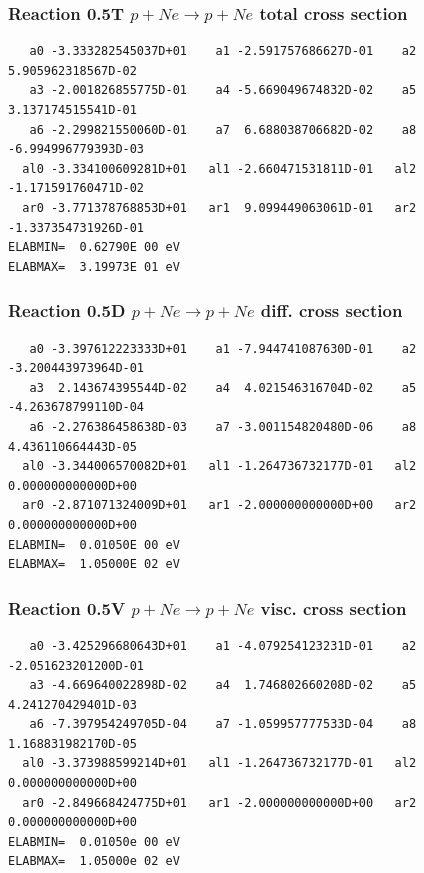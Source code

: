 \documentclass[12pt,dvips]{article}
\begin{document}
\subsubsection{
Reaction 0.5T   $ p + Ne \rightarrow p + Ne $ total cross
section }



\begin{small}\begin{verbatim}
   a0 -3.333282545037D+01    a1 -2.591757686627D-01    a2  5.905962318567D-02
   a3 -2.001826855775D-01    a4 -5.669049674832D-02    a5  3.137174515541D-01
   a6 -2.299821550060D-01    a7  6.688038706682D-02    a8 -6.994996779393D-03
  al0 -3.334100609281D+01   al1 -2.660471531811D-01   al2 -1.171591760471D-02
  ar0 -3.771378768853D+01   ar1  9.099449063061D-01   ar2 -1.337354731926D-01
ELABMIN=  0.62790E 00 eV
ELABMAX=  3.19973E 01 eV
\end{verbatim}\end{small}

\subsubsection{
Reaction 0.5D    $p + Ne \rightarrow p + Ne  $ diff. cross
section }


\begin{small}\begin{verbatim}
   a0 -3.397612223333D+01    a1 -7.944741087630D-01    a2 -3.200443973964D-01
   a3  2.143674395544D-02    a4  4.021546316704D-02    a5 -4.263678799110D-04
   a6 -2.276386458638D-03    a7 -3.001154820480D-06    a8  4.436110664443D-05
  al0 -3.344006570082D+01   al1 -1.264736732177D-01   al2  0.000000000000D+00
  ar0 -2.871071324009D+01   ar1 -2.000000000000D+00   ar2  0.000000000000D+00
ELABMIN=  0.01050E 00 eV
ELABMAX=  1.05000E 02 eV
\end{verbatim}\end{small}


\subsubsection{
Reaction 0.5V   $ p + Ne \rightarrow p + Ne  $ visc. cross
section }


\begin{small}\begin{verbatim}
   a0 -3.425296680643D+01    a1 -4.079254123231D-01    a2 -2.051623201200D-01
   a3 -4.669640022898D-02    a4  1.746802660208D-02    a5  4.241270429401D-03
   a6 -7.397954249705D-04    a7 -1.059957777533D-04    a8  1.168831982170D-05
  al0 -3.373988599214D+01   al1 -1.264736732177D-01   al2  0.000000000000D+00
  ar0 -2.849668424775D+01   ar1 -2.000000000000D+00   ar2  0.000000000000D+00
ELABMIN=  0.01050e 00 eV
ELABMAX=  1.05000e 02 eV
\end{verbatim}\end{small}
\end{document}
